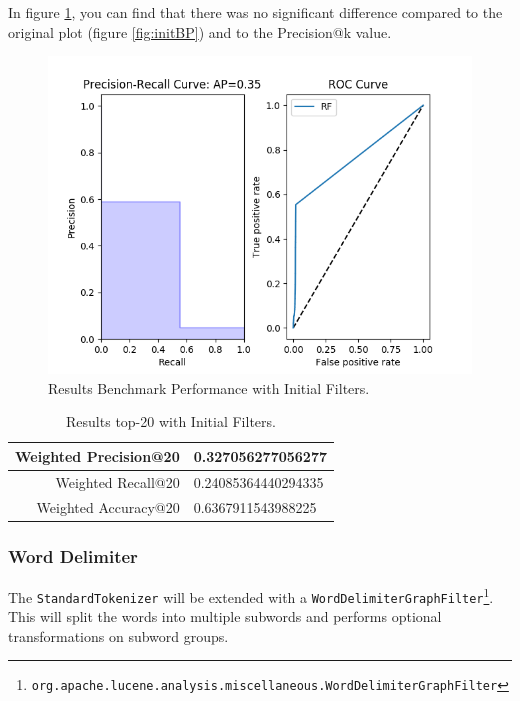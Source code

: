 \documentclass[11pt]{article}
\begin{document}
In figure \ref{fig:alphanumeric}, you can find that there was no significant difference compared to the original plot (figure \ref{fig:initBP}) and to the \textsf{Precision@k} value.
\begin{figure}[htp]
    \centering
    \includegraphics[width=\textwidth]{images/2ndTerm/Trim}
    \caption{Results Benchmark Performance with Initial Filters.}
    \label{fig:alphanumeric}
\end{figure}

\begin{table}[htp]
	\centering
	\begin{tabular}{|r|l|}
		\hline
		Weighted \textsf{Precision@20} & 0.327056277056277 \\ \hline
		Weighted \textsf{Recall@20} & 0.24085364440294335 \\ \hline
		Weighted \textsf{Accuracy@20} & 0.6367911543988225 \\ \hline
	\end{tabular}
	\caption{Results top-20 with Initial Filters.}
	\label{tbl:atk-trim}
\end{table}

\subsubsection{Word Delimiter}\label{sec:word-delimiter}
The \texttt{StandardTokenizer} will be extended with a \texttt{WordDelimiterGraphFilter}\footnote{\texttt{org.apache.lucene.analysis.miscellaneous.WordDelimiterGraphFilter}}. This will split the words into multiple subwords and performs optional transformations on subword groups. \cite{lucene}
\end{document}
